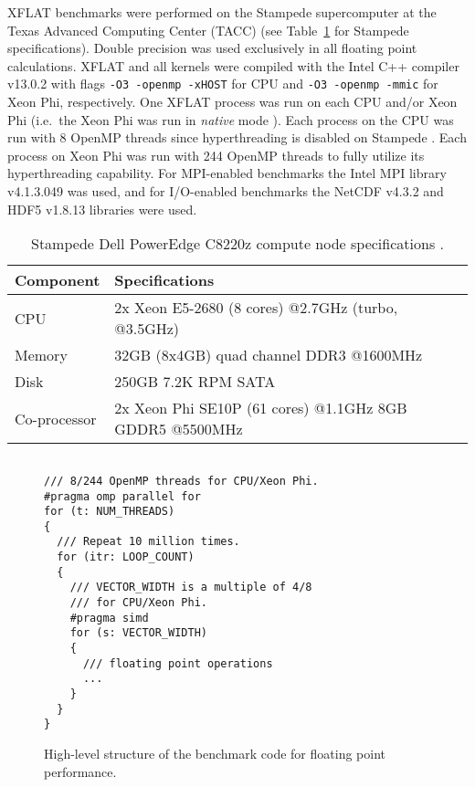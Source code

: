 \documentclass{sig-alternate}
\begin{document}
XFLAT benchmarks were performed on the Stampede supercomputer
at the Texas Advanced Computing Center (TACC)
(see Table~\ref{tab:stampede} for Stampede specifications). 
Double precision was used exclusively in all floating point
calculations. XFLAT and all kernels were
compiled with the Intel C++ compiler v13.0.2
with flags \texttt{-O3 -openmp -xHOST} for CPU and
\texttt{-O3 -openmp -mmic} for Xeon Phi, respectively.
One XFLAT process was run on each CPU and/or Xeon Phi (i.e.\ the
Xeon Phi was run in \emph{native} mode \cite{JeffersReinders201303}).
Each process on the CPU was run with 8 OpenMP threads since
hyperthreading is disabled on Stampede \cite{Stampede}. Each process
on Xeon Phi was run with
244 OpenMP threads to fully utilize its hyperthreading capability.
For MPI-enabled benchmarks the Intel
MPI library v4.1.3.049 was used, and for I/O-enabled benchmarks the
NetCDF v4.3.2 and HDF5 v1.8.13 libraries were used. 

\begin{table}[t]
\centering
\caption{Stampede Dell PowerEdge C8220z compute node specifications \cite{Stampede}.}
\renewcommand{\arraystretch}{1.2}
\begin{tabular}[t]{ p{2cm}  p{5.7cm} } \hline\hline
Component & Specifications \\ \hline
CPU & 2x Xeon E5-2680 (8 cores) @2.7GHz (turbo, @3.5GHz)\\
Memory  & 32GB (8x4GB) quad channel DDR3 @1600MHz\\ 
Disk & 250GB 7.2K RPM SATA\\ 
Co-processor & 2x Xeon Phi SE10P (61 cores) @1.1GHz
8GB GDDR5 @5500MHz \\ \hline\hline
\end{tabular}
\label{tab:stampede}
\end{table}

\begin{figure}[t]
\begin{verbatim}

/// 8/244 OpenMP threads for CPU/Xeon Phi.
#pragma omp parallel for
for (t: NUM_THREADS)
{
  /// Repeat 10 million times.
  for (itr: LOOP_COUNT)
  {
    /// VECTOR_WIDTH is a multiple of 4/8 
    /// for CPU/Xeon Phi.
    #pragma simd
    for (s: VECTOR_WIDTH)
    {
      /// floating point operations
      ...
    }
  }
}
\end{verbatim}\caption{High-level structure of the benchmark code for floating
  point performance.}\label{fig:benchmark}\end{figure}
\end{document}
